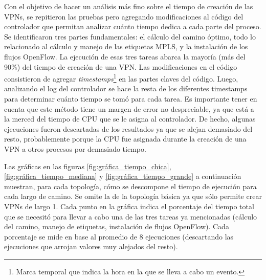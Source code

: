 Con el objetivo de hacer un análisis más fino sobre el tiempo de creación de las VPNs, se repitieron las pruebas pero agregando modificaciones al código del controlador que permitan analizar cuánto tiempo dedica a cada parte del proceso. Se identificaron tres partes fundamentales: el cálculo del camino óptimo, todo lo relacionado al cálculo y manejo de las etiquetas MPLS, y la instalación de los flujos OpenFlow. La ejecución de esas tres tareas abarca la mayoría (más del 90\%) del tiempo de creación de una VPN. Las modificaciones en el código consistieron de agregar \textit{timestamps}\footnote{Marca temporal que indica la hora en la que se lleva a cabo un evento.} en las partes claves del código. Luego, analizando el log del controlador se hace la resta de los diferentes timestamps para determinar cuánto tiempo se tomó para cada tarea. Es importante tener en cuenta que este método tiene un margen de error no despreciable, ya que está a la merced del tiempo de CPU que se le asigna al controlador. De hecho, algunas ejecuciones fueron descartadas de los resultados ya que se alejan demasiado del resto, probablemente porque la CPU fue asignada durante la creación de una VPN a otros procesos por demasiado tiempo.

Las gráficas en las figuras \ref{fig:gráfica_tiempo_chica}, \ref{fig:gráfica_tiempo_mediana} y \ref{fig:gráfica_tiempo_grande} a continuación muestran, para cada topología, cómo se descompone el tiempo de ejecución para cada largo de camino. Se omite la de la topología básica ya que sólo permite crear VPNs de largo 1. Cada punto en la gráfica indica el porcentaje del tiempo total que se necesitó para llevar a cabo una de las tres tareas ya mencionadas (cálculo del camino, manejo de etiquetas, instalación de flujos OpenFlow). Cada porcentaje se mide en base al promedio de 8 ejecuciones (descartando las ejecuciones que arrojan valores muy alejados del resto).

